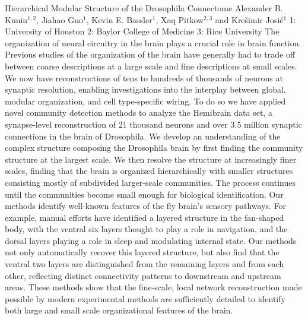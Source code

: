 \begin{addmargin}[2em]{0em}
\vspace{1.5ex}
\abs
{Hierarchical Modular Structure of the Drosophila Connectome}
{Alexander B. Kunin$^{1,2}$, Jiahao Guo$^{1}$, Kevin E. Bassler$^{1}$, Xaq Pitkow$^{2,3}$ and Krešimir Josić$^{1}$ }
{1: University of Houston 2: Baylor College of Medicine 3: Rice University}
{The organization of neural circuitry in the brain plays a crucial role in brain function. Previous studies of the organization of the brain have generally had to trade off between coarse descriptions at a large scale and fine descriptions at small scales. We now have reconstructions of tens to hundreds of thousands of neurons at synaptic resolution, enabling investigations into the interplay between global, modular organization, and cell type-specific wiring. To do so we have applied novel community detection methods to analyze the Hemibrain data set, a synapse-level reconstruction of 21 thousand neurons and over 3.5 million synaptic connections in the brain of Drosophila. We develop an understanding of the complex structure composing the Drosophila brain by first finding the community structure at the largest scale. We then resolve the structure at increasingly finer scales, finding that the brain is organized hierarchically with smaller structures consisting mostly of subdivided larger-scale communities. The process continues until the communities become small enough for biological identification. Our methods identify well-known features of the fly brain's sensory pathways. For example, manual efforts have identified a layered structure in the fan-shaped body, with the ventral six layers thought to play a role in navigation, and the dorsal layers playing a role in sleep and modulating internal state. Our methods not only automatically recover this layered structure, but also find that the ventral two layers are distinguished from the remaining layers and from each other, reflecting distinct connectivity patterns to downstream and upstream areas. These methods show that the fine-scale, local network reconstruction made possible by modern experimental methods are sufficiently detailed to identify both large and small scale organizational features of the brain.}



\end{addmargin}
